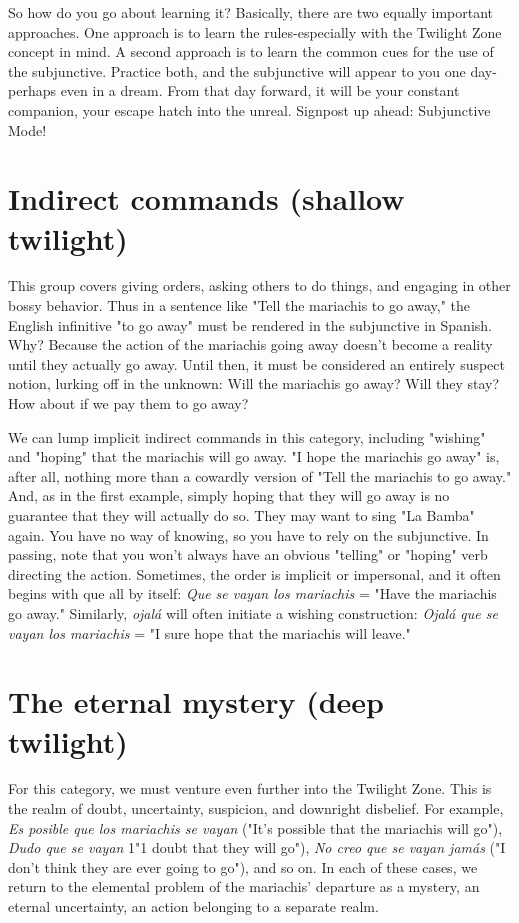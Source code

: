 \documentclass[14pt,a4paper,oneside]{memoir}
\begin{document}
So how do you go about learning it? Basically, there are two
equally important approaches. One approach is to learn the
rules-especially with the Twilight Zone concept in mind. A second
approach is to learn the common cues for the use of the subjunctive.
Practice both, and the subjunctive will appear to you one day-perhaps
even in a dream. From that day forward, it will be your constant companion, your escape hatch into the unreal. Signpost up ahead: Subjunctive Mode!

\section{Indirect commands (shallow twilight)}

This group covers giving orders, asking others to do things,
and engaging in other bossy behavior. Thus in a sentence like "Tell the
mariachis to go away," the English infinitive "to go away" must be rendered in the subjunctive in Spanish. Why? Because the action of the
mariachis going away doesn't become a reality until they actually go
away. Until then, it must be considered an entirely suspect notion,
lurking off in the unknown: Will the mariachis go away? Will they
stay? How about if we pay them to go away?

We can lump implicit indirect commands in this category, including "wishing" and "hoping" that the mariachis will go away. "I
hope the mariachis go away" is, after all, nothing more than a cowardly version of "Tell the mariachis to go away." And, as in the first
example, simply hoping that they will go away is no guarantee that
they will actually do so. They may want to sing "La Bamba" again.
You have no way of knowing, so you have to rely on the subjunctive. In
passing, note that you won't always have an obvious "telling" or "hoping" verb directing the action. Sometimes, the order is implicit or impersonal, and it often begins with que all by itself: \emph{Que se vayan los
	mariachis} = "Have the mariachis go away." Similarly, \emph{ojalá} will often
initiate a wishing construction: \emph{Ojalá que se vayan los mariachis} =
"I sure hope that the mariachis will leave."

\section{The eternal mystery (deep twilight)}

For this category, we must venture even further into the Twilight Zone. This is the realm of doubt, uncertainty, suspicion, and
downright disbelief. For example, \emph{Es posible que los mariachis se
	vayan} ("It's possible that the mariachis will go"), \emph{Dudo que se vayan}
1"1 doubt that they will go"), \emph{No creo que se vayan jamás} ("I don't
think they are ever going to go"), and so on. In each of these cases, we
return to the elemental problem of the mariachis' departure as a mystery, an eternal uncertainty, an action belonging to a separate realm.
\end{document}
